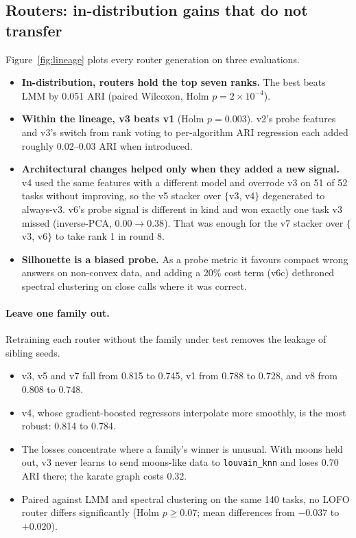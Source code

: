 \documentclass[11pt,a4paper]{article}
\newcommand{\code}[1]{\texttt{#1}}
\begin{document}
\subsection{Routers: in-distribution gains that do not transfer}
Figure~\ref{fig:lineage} plots every router generation on three evaluations.
\begin{itemize}
  \item \textbf{In-distribution, routers hold the top seven ranks.} The best
  beats LMM by 0.051 ARI (paired Wilcoxon, Holm $p = 2\times10^{-4}$).
  \item \textbf{Within the lineage, v3 beats v1} (Holm $p = 0.003$). v2's
  probe features and v3's switch from rank voting to per-algorithm ARI
  regression each added roughly 0.02--0.03 ARI when introduced.
  \item \textbf{Architectural changes helped only when they added a new
  signal.} v4 used the same features with a different model and overrode v3
  on 51 of 52 tasks without improving, so the v5 stacker over $\{$v3, v4$\}$
  degenerated to always-v3. v6's probe signal is different in kind and won
  exactly one task v3 missed (inverse-PCA, $0.00 \to 0.38$). That was enough
  for the v7 stacker over $\{$v3, v6$\}$ to take rank 1 in round 8.
  \item \textbf{Silhouette is a biased probe.} As a probe metric it favours
  compact wrong answers on non-convex data, and adding a 20\% cost term (v6c)
  dethroned spectral clustering on close calls where it was correct.
\end{itemize}

\paragraph{Leave one family out.} Retraining each router without the family
under test removes the leakage of sibling seeds.
\begin{itemize}
  \item v3, v5 and v7 fall from 0.815 to 0.745, v1 from 0.788 to 0.728, and
  v8 from 0.808 to 0.748.
  \item v4, whose gradient-boosted regressors interpolate more smoothly, is the
  most robust: 0.814 to 0.784.
  \item The losses concentrate where a family's winner is unusual. With moons
  held out, v3 never learns to send moons-like data to \code{louvain\_knn} and
  loses 0.70 ARI there; the karate graph costs 0.32.
  \item Paired against LMM and spectral clustering on the same 140 tasks, no
  LOFO router differs significantly (Holm $p \ge 0.07$; mean differences
  from $-0.037$ to $+0.020$).
\end{itemize}
\end{document}
